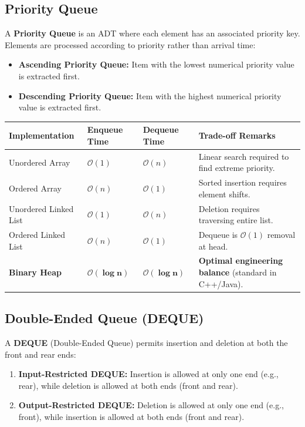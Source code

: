 \documentclass[12pt,a4paper]{article}
\renewcommand{\arraystretch}{1.45}
\begin{document}
\subsection{Priority Queue}
A \textbf{Priority Queue} is an ADT where each element has an associated priority key. Elements are processed according to priority rather than arrival time:
\begin{itemize}[leftmargin=*, itemsep=3pt]
  \item \textbf{Ascending Priority Queue:} Item with the lowest numerical priority value is extracted first.
  \item \textbf{Descending Priority Queue:} Item with the highest numerical priority value is extracted first.
\end{itemize}

\par\vspace{6pt}\noindent
\begingroup
\setlength{\tabcolsep}{4.5pt}
\setlength{\extrarowheight}{3pt}
\renewcommand{\arraystretch}{1.3}
\begin{tabularx}{\linewidth}{|B{3.2cm}|B{3.0cm}|B{3.0cm}|Y|}
\hline
\textbf{Implementation} & \textbf{Enqueue Time} & \textbf{Dequeue Time} & \textbf{Trade-off Remarks} \\
\hline
Unordered Array & $\mathcal{O}(1)$ & $\mathcal{O}(n)$ & Linear search required to find extreme priority. \\
\hline
Ordered Array & $\mathcal{O}(n)$ & $\mathcal{O}(1)$ & Sorted insertion requires element shifts. \\
\hline
Unordered Linked List & $\mathcal{O}(1)$ & $\mathcal{O}(n)$ & Deletion requires traversing entire list. \\
\hline
Ordered Linked List & $\mathcal{O}(n)$ & $\mathcal{O}(1)$ & Dequeue is $\mathcal{O}(1)$ removal at head. \\
\hline
\textbf{Binary Heap} & $\mathbf{\mathcal{O}(\log n)}$ & $\mathbf{\mathcal{O}(\log n)}$ & \textbf{Optimal engineering balance} (standard in C++/Java). \\
\hline
\end{tabularx}
\endgroup

\subsection{Double-Ended Queue (DEQUE)}
A \textbf{DEQUE} (Double-Ended Queue) permits insertion and deletion at both the front and rear ends:
\begin{enumerate}[leftmargin=*, itemsep=3pt]
  \item \textbf{Input-Restricted DEQUE:} Insertion is allowed at only one end (e.g., rear), while deletion is allowed at both ends (front and rear).
  \item \textbf{Output-Restricted DEQUE:} Deletion is allowed at only one end (e.g., front), while insertion is allowed at both ends (front and rear).
\end{enumerate}
\end{document}
